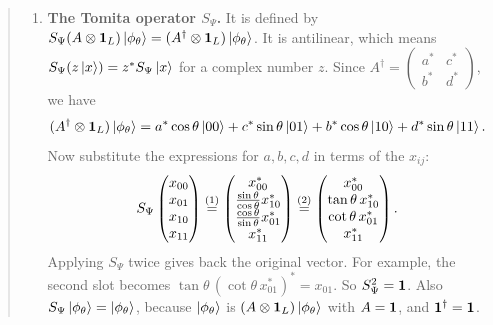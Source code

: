 \begin{quote}
\begin{enumerate}
\item \textbf{The Tomita operator $S_\Psi$.} It is defined by
$S_\Psi(A\otimes\mathbf{1}_L)\ket{\phi_\theta} = (A^\dagger\otimes\mathbf{1}_L)\ket{\phi_\theta}$. It is antilinear, which
means $S_\Psi(z\ket x)=z^*S_\Psi\ket x$ for a complex number $z$. Since
$A^\dagger = \begin{pmatrix} a^* & c^* \\ b^* & d^* \end{pmatrix}$, we have
\[
(A^\dagger\otimes\mathbf{1}_L)\ket{\phi_\theta} = a^*\cos\theta\ket{00} + c^*\sin\theta\ket{01}
+ b^*\cos\theta\ket{10} + d^*\sin\theta\ket{11} .
\]
Now substitute the expressions for $a,b,c,d$ in terms of the $x_{ij}$:
\begin{align}
S_\Psi \begin{pmatrix} x_{00} \\ x_{01} \\ x_{10} \\ x_{11} \end{pmatrix}
\overset{(1)}{=} \begin{pmatrix} x_{00}^* \\ \frac{\sin\theta}{\cos\theta} x_{10}^* \\
\frac{\cos\theta}{\sin\theta} x_{01}^* \\ x_{11}^* \end{pmatrix}
\overset{(2)}{=} \begin{pmatrix} x_{00}^* \\ \tan\theta\, x_{10}^* \\ \cot\theta\, x_{01}^* \\ x_{11}^*
\end{pmatrix} . \notag
\end{align}
\quad
{}
Applying $S_\Psi$ twice gives back the original vector. For example, the second slot becomes
$\tan\theta\,(\cot\theta\,x_{01}^*)^*=x_{01}$. So $S_\Psi^2 = \mathbf{1}$. Also $S_\Psi\ket{\phi_\theta} =
\ket{\phi_\theta}$, because $\ket{\phi_\theta}$ is $(A\otimes\mathbf{1}_L)\ket{\phi_\theta}$ with $A=\mathbf{1}$, and
$\mathbf{1}^\dagger=\mathbf{1}$.


\end{enumerate}
\end{quote}
